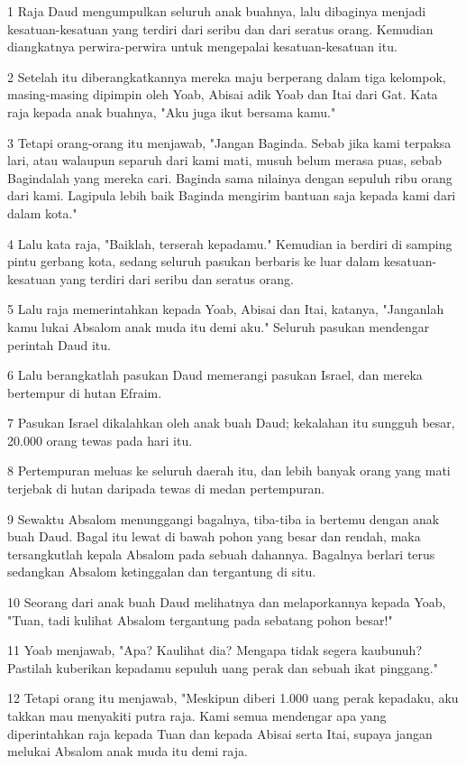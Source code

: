 \par 1 Raja Daud mengumpulkan seluruh anak buahnya, lalu dibaginya menjadi kesatuan-kesatuan yang terdiri dari seribu dan dari seratus orang. Kemudian diangkatnya perwira-perwira untuk mengepalai kesatuan-kesatuan itu.
\par 2 Setelah itu diberangkatkannya mereka maju berperang dalam tiga kelompok, masing-masing dipimpin oleh Yoab, Abisai adik Yoab dan Itai dari Gat. Kata raja kepada anak buahnya, "Aku juga ikut bersama kamu."
\par 3 Tetapi orang-orang itu menjawab, "Jangan Baginda. Sebab jika kami terpaksa lari, atau walaupun separuh dari kami mati, musuh belum merasa puas, sebab Bagindalah yang mereka cari. Baginda sama nilainya dengan sepuluh ribu orang dari kami. Lagipula lebih baik Baginda mengirim bantuan saja kepada kami dari dalam kota."
\par 4 Lalu kata raja, "Baiklah, terserah kepadamu." Kemudian ia berdiri di samping pintu gerbang kota, sedang seluruh pasukan berbaris ke luar dalam kesatuan-kesatuan yang terdiri dari seribu dan seratus orang.
\par 5 Lalu raja memerintahkan kepada Yoab, Abisai dan Itai, katanya, "Janganlah kamu lukai Absalom anak muda itu demi aku." Seluruh pasukan mendengar perintah Daud itu.
\par 6 Lalu berangkatlah pasukan Daud memerangi pasukan Israel, dan mereka bertempur di hutan Efraim.
\par 7 Pasukan Israel dikalahkan oleh anak buah Daud; kekalahan itu sungguh besar, 20.000 orang tewas pada hari itu.
\par 8 Pertempuran meluas ke seluruh daerah itu, dan lebih banyak orang yang mati terjebak di hutan daripada tewas di medan pertempuran.
\par 9 Sewaktu Absalom menunggangi bagalnya, tiba-tiba ia bertemu dengan anak buah Daud. Bagal itu lewat di bawah pohon yang besar dan rendah, maka tersangkutlah kepala Absalom pada sebuah dahannya. Bagalnya berlari terus sedangkan Absalom ketinggalan dan tergantung di situ.
\par 10 Seorang dari anak buah Daud melihatnya dan melaporkannya kepada Yoab, "Tuan, tadi kulihat Absalom tergantung pada sebatang pohon besar!"
\par 11 Yoab menjawab, "Apa? Kaulihat dia? Mengapa tidak segera kaubunuh? Pastilah kuberikan kepadamu sepuluh uang perak dan sebuah ikat pinggang."
\par 12 Tetapi orang itu menjawab, "Meskipun diberi 1.000 uang perak kepadaku, aku takkan mau menyakiti putra raja. Kami semua mendengar apa yang diperintahkan raja kepada Tuan dan kepada Abisai serta Itai, supaya jangan melukai Absalom anak muda itu demi raja.
